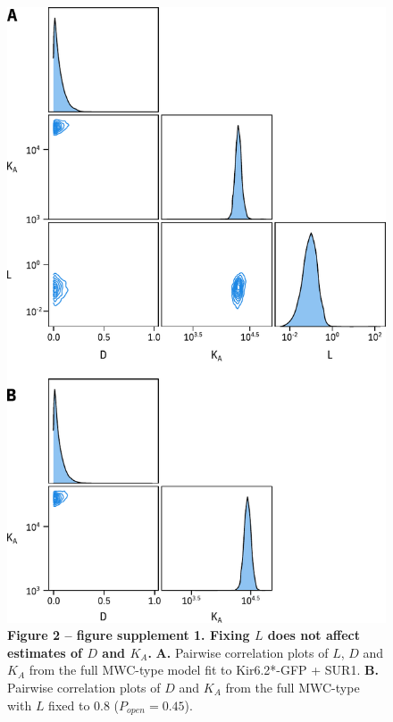\documentclass[10pt,lineno, doublespacing]{elife_modified}
\begin{document}
\begin{figure}
\begin{fullwidth}
\centering
\includegraphics[height=0.88\textheight]{figure_two_s1}
\captionsetup{labelformat=empty}
\caption{
\textbf{Figure 2 -- figure supplement 1. Fixing $L$ does not affect estimates of $D$ and $K_A$.}
\textbf{A.}
Pairwise correlation plots of $L$, $D$ and $K_A$ from the full MWC-type model fit to Kir6.2*-GFP + SUR1.
\textbf{B.}
Pairwise correlation plots of $D$ and $K_A$ from the full MWC-type with $L$ fixed to 0.8 ($P_{open} = 0.45$).
}
\label{fig:two_s1}
\end{fullwidth}
\end{figure}
\end{document}
